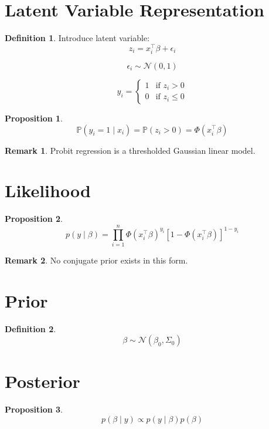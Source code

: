 \documentclass[12pt,oneside]{book}
\numberwithin{equation}{section}
\theoremstyle{definition}
\newtheorem{definition}{Definition}[section]
\newtheorem{remark}{Remark}[section]
\theoremstyle{plain}
\newtheorem{proposition}{Proposition}[section]
\theoremstyle{remark}
\newcommand{\Prob}{\mathbb{P}}
\newcommand{\Normal}{\mathcal{N}}
\begin{document}
\section{Latent Variable Representation}

\begin{definition}
Introduce latent variable:
$$
z_i = x_i^\top \beta + \epsilon_i
$$

$$
\epsilon_i \sim \Normal(0,1)
$$

$$
y_i =
\begin{cases}
1 & \text{if } z_i > 0 \\
0 & \text{if } z_i \le 0
\end{cases}
$$
\end{definition}

\begin{proposition}
$$
\Prob(y_i = 1 \mid x_i)
=
\Prob(z_i > 0)
=
\Phi(x_i^\top \beta)
$$
\end{proposition}

\begin{remark}
Probit regression is a thresholded Gaussian linear model.
\end{remark}

\section{Likelihood}

\begin{proposition}
$$
p(y \mid \beta)
=
\prod_{i=1}^n
\Phi(x_i^\top \beta)^{y_i}
\left[1 - \Phi(x_i^\top \beta)\right]^{1 - y_i}
$$
\end{proposition}

\begin{remark}
No conjugate prior exists in this form.
\end{remark}

\section{Prior}

\begin{definition}
$$
\beta \sim \Normal(\beta_0, \Sigma_0)
$$
\end{definition}

\section{Posterior}

\begin{proposition}
$$
p(\beta \mid y)
\propto
p(y \mid \beta)p(\beta)
$$
\end{proposition}
\end{document}

